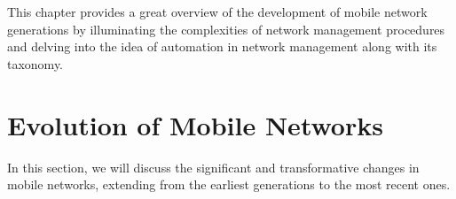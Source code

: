 \setlength{\parskip}{\baselineskip}

This chapter provides a great overview of the development of mobile network generations by illuminating the complexities of network management procedures and delving into the idea of automation in network management along with its taxonomy.
\section{Evolution of Mobile Networks} 
In this section, we will discuss the significant and transformative changes in mobile networks, extending from the earliest generations to the most recent ones.
